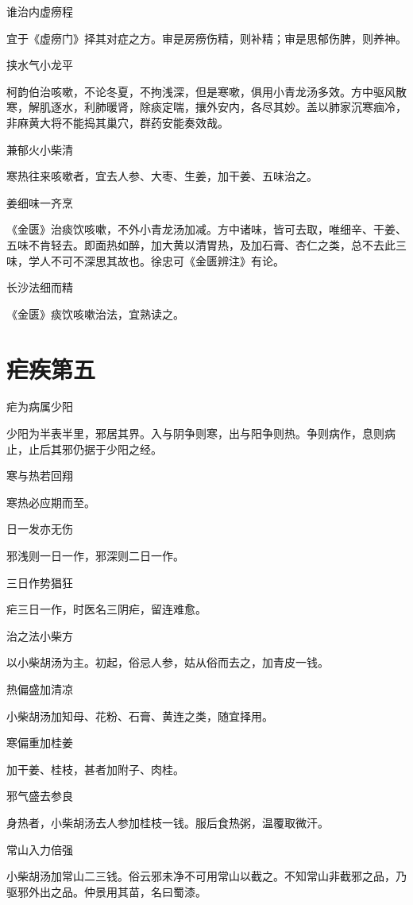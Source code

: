 \documentclass[a4paper,12pt,UTF8,twoside]{ctexbook}
\begin{document}
	谁治内虚痨程

	宜于《虚痨门》择其对症之方。审是房痨伤精，则补精；审是思郁伤脾，则养神。
	
	挟水气小龙平

	柯韵伯治咳嗽，不论冬夏，不拘浅深，但是寒嗽，俱用小青龙汤多效。方中驱风散寒，解肌逐水，利肺暖肾，除痰定喘，攘外安内，各尽其妙。盖以肺家沉寒痼冷，非麻黄大将不能捣其巢穴，群药安能奏效哉。
	
	兼郁火小柴清
	
  寒热往来咳嗽者，宜去人参、大枣、生姜，加干姜、五味治之。
	
	姜细味一齐烹
	
  《金匮》治痰饮咳嗽，不外小青龙汤加减。方中诸味，皆可去取，唯细辛、干姜、五味不肯轻去。即面热如醉，加大黄以清胃热，及加石膏、杏仁之类，总不去此三味，学人不可不深思其故也。徐忠可《金匮辨注》有论。
	
	长沙法细而精
	
  《金匮》痰饮咳嗽治法，宜熟读之。
	
	\chapter{疟疾第五}
	疟为病属少阳
	
  少阳为半表半里，邪居其界。入与阴争则寒，出与阳争则热。争则病作，息则病止，止后其邪仍据于少阳之经。
	
	寒与热若回翔
	
  寒热必应期而至。
	
	日一发亦无伤
	
  邪浅则一日一作，邪深则二日一作。
	
	三日作势猖狂
	
  疟三日一作，时医名三阴疟，留连难愈。
	
	治之法小柴方
	
  以小柴胡汤为主。初起，俗忌人参，姑从俗而去之，加青皮一钱。
	
	热偏盛加清凉
	
  小柴胡汤加知母、花粉、石膏、黄连之类，随宜择用。
	
	寒偏重加桂姜
	
  加干姜、桂枝，甚者加附子、肉桂。
	
	邪气盛去参良
	
  身热者，小柴胡汤去人参加桂枝一钱。服后食热粥，温覆取微汗。
	
	常山入力倍强
	
  小柴胡汤加常山二三钱。俗云邪未净不可用常山以截之。不知常山非截邪之品，乃驱邪外出之品。仲景用其苗，名曰蜀漆。
	
\end{document}
